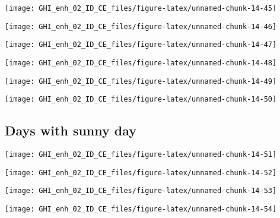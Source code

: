 \documentclass[
  10pt,
  a4paper,oneside]{article}
\begin{document}
\begin{center}\texttt{[image: GHI\_enh\_02\_ID\_CE\_files/figure-latex/unnamed-chunk-14-45]} \end{center}

\begin{center}\texttt{[image: GHI\_enh\_02\_ID\_CE\_files/figure-latex/unnamed-chunk-14-46]} \end{center}

\begin{center}\texttt{[image: GHI\_enh\_02\_ID\_CE\_files/figure-latex/unnamed-chunk-14-47]} \end{center}

\begin{center}\texttt{[image: GHI\_enh\_02\_ID\_CE\_files/figure-latex/unnamed-chunk-14-48]} \end{center}

\begin{center}\texttt{[image: GHI\_enh\_02\_ID\_CE\_files/figure-latex/unnamed-chunk-14-49]} \end{center}

\begin{center}\texttt{[image: GHI\_enh\_02\_ID\_CE\_files/figure-latex/unnamed-chunk-14-50]} \end{center}

\FloatBarrier

\hypertarget{days-with-sunny-day}{%
\subsection{Days with sunny day}\label{days-with-sunny-day}}

\begin{center}\texttt{[image: GHI\_enh\_02\_ID\_CE\_files/figure-latex/unnamed-chunk-14-51]} \end{center}

\begin{center}\texttt{[image: GHI\_enh\_02\_ID\_CE\_files/figure-latex/unnamed-chunk-14-52]} \end{center}

\begin{center}\texttt{[image: GHI\_enh\_02\_ID\_CE\_files/figure-latex/unnamed-chunk-14-53]} \end{center}

\begin{center}\texttt{[image: GHI\_enh\_02\_ID\_CE\_files/figure-latex/unnamed-chunk-14-54]} \end{center}
\end{document}
